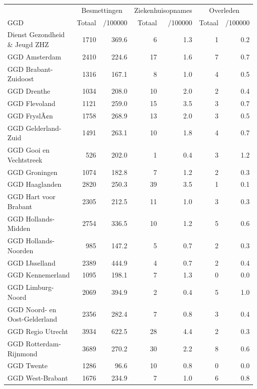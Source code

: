 \documentclass[
  english,
  man,floatsintext]{apa6}
\begin{document}
\begin{table}
\centering\begingroup\fontsize{10}{12}\selectfont

\begin{threeparttable}
\begin{tabular}{lrrrrrr}
\toprule
\multicolumn{1}{c}{ } & \multicolumn{2}{c}{Besmettingen} & \multicolumn{2}{c}{Ziekenhuisopnames} & \multicolumn{2}{c}{Overleden} \\
\cmidrule(l{3pt}r{3pt}){2-3} \cmidrule(l{3pt}r{3pt}){4-5} \cmidrule(l{3pt}r{3pt}){6-7}
GGD & Totaal & /100000 & Totaal & /100000 & Totaal & /100000\\
\midrule
Dienst Gezondheid \& Jeugd ZHZ & 1710 & 369.6 & 6 & 1.3 & 1 & 0.2\\
GGD Amsterdam & 2410 & 224.6 & 17 & 1.6 & 7 & 0.7\\
GGD Brabant-Zuidoost & 1316 & 167.1 & 8 & 1.0 & 4 & 0.5\\
GGD Drenthe & 1034 & 208.0 & 10 & 2.0 & 2 & 0.4\\
GGD Flevoland & 1121 & 259.0 & 15 & 3.5 & 3 & 0.7\\
GGD FryslÃ¢n & 1758 & 268.9 & 13 & 2.0 & 3 & 0.5\\
GGD Gelderland-Zuid & 1491 & 263.1 & 10 & 1.8 & 4 & 0.7\\
GGD Gooi en Vechtstreek & 526 & 202.0 & 1 & 0.4 & 3 & 1.2\\
GGD Groningen & 1074 & 182.8 & 7 & 1.2 & 2 & 0.3\\
GGD Haaglanden & 2820 & 250.3 & 39 & 3.5 & 1 & 0.1\\
GGD Hart voor Brabant & 2305 & 212.5 & 11 & 1.0 & 3 & 0.3\\
GGD Hollands-Midden & 2754 & 336.5 & 10 & 1.2 & 5 & 0.6\\
GGD Hollands-Noorden & 985 & 147.2 & 5 & 0.7 & 2 & 0.3\\
GGD IJsselland & 2389 & 444.9 & 4 & 0.7 & 2 & 0.4\\
GGD Kennemerland & 1095 & 198.1 & 7 & 1.3 & 0 & 0.0\\
GGD Limburg-Noord & 2069 & 394.9 & 2 & 0.4 & 5 & 1.0\\
GGD Noord- en Oost-Gelderland & 2356 & 282.4 & 7 & 0.8 & 3 & 0.4\\
GGD Regio Utrecht & 3934 & 622.5 & 28 & 4.4 & 2 & 0.3\\
GGD Rotterdam-Rijnmond & 3689 & 270.2 & 30 & 2.2 & 8 & 0.6\\
GGD Twente & 1286 & 96.6 & 10 & 0.8 & 0 & 0.0\\
GGD West-Brabant & 1676 & 234.9 & 7 & 1.0 & 6 & 0.8\\

\end{tabular}
\end{threeparttable}
\end{table}
\end{document}
